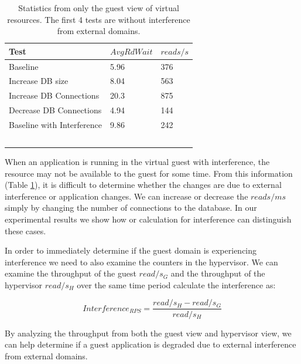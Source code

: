 \begin{table}[h]
  \begin{tabular}{ l l p{5cm} }
    Test & $AvgRdWait$ & $reads/s$  \\
    \hline
    Baseline                     & 5.96 & 376 \\   %
    Increase DB size             & 8.04 & 563 \\   %
    Increase DB Connections      & 20.3 & 875 \\   %
    Decrease DB Connections      & 4.94 & 144 \\   %
    Baseline with Interference   & 9.86 & 242 \\   %
    \hline
  \end{tabular}
\caption{Statistics from only the guest view of virtual resources.  The first 4 tests are without interference from external domains. }
\label{tab:guestOnly}
\end{table}

When an application is running in the virtual guest with interference, the resource may not be available to the guest for some time.  From this information (Table \ref{tab:guestOnly}), it is difficult to determine whether the changes are due to external interference or application changes. We can increase or decrease the $reads/ms$ simply by changing the number of connections to the database.  In our experimental results we show how or calculation for interference can distinguish these cases.  

In order to immediately determine if the guest domain is experiencing interference we need to also examine the counters in the hypervisor.  We can examine the throughput of the guest $read/s_G$ and the throughput of the hypervisor $read/s_H$ over the same time period calculate the interference as:

\begin{equation}
	Interference_{RPS} = \frac{read/s_H - read/s_G}{read/s_H} 
\end{equation}

By analyzing the throughput from both the guest view and hypervisor view, we can help determine if a guest application is degraded due to external interference from external domains.

